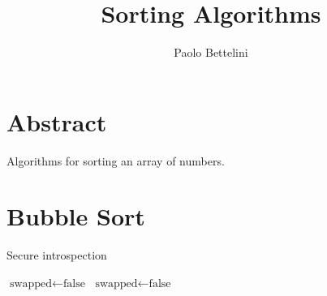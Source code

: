 \documentclass{article}
\title{Sorting Algorithms}
\author{Paolo Bettelini}
\date{}
\begin{document}
\maketitle

\section*{Abstract}
Algorithms for sorting an array of numbers.

\pagebreak

\tableofcontents
\pagebreak

\section{Bubble Sort}

\begin{algorithm}
	\caption{Secure introspection}\label{algo}
	\begin{algorithmic}
		\State \(\text{swapped}\gets\text{false}\)
		\Do
			\State \(\text{swapped}\gets\text{false}\)
			\EndFor
		
		
		
	\end{algorithmic}
\end{algorithm}
\end{document}
